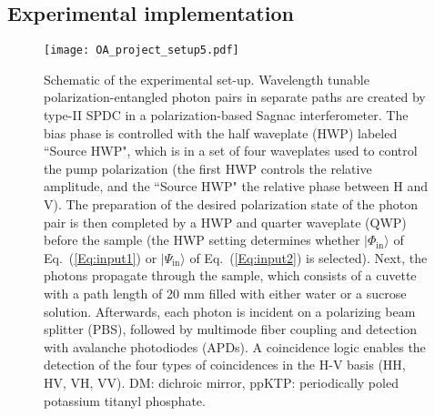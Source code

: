 \documentclass[12pt,preprint]{revtex4}
\begin{document}
\subsection*{Experimental implementation}
\begin{figure}[htb]
	\centering
		\texttt{[image: OA\_project\_setup5.pdf]}
	\caption{Schematic of the experimental set-up. Wavelength tunable polarization-entangled photon pairs in separate paths are created by type-II SPDC in a polarization-based Sagnac interferometer. The bias phase is controlled with the half waveplate (HWP) labeled ``Source HWP", which is in a set of four waveplates used to control the pump polarization (the first HWP controls the relative amplitude, and the ``Source HWP" the relative phase between H and V). The preparation of the desired polarization state of the photon pair is then completed by a HWP and quarter waveplate (QWP) before the sample (the HWP setting determines whether $|\Phi_{\mathrm{in}}\rangle$ of Eq.\ (\ref{Eq:input1}) or $|\Psi_{\mathrm{in}}\rangle$ of Eq.\ (\ref{Eq:input2}) is selected). Next, the photons propagate through the sample, which consists of a cuvette with a path length of 20 mm filled with either water or a sucrose solution. Afterwards, each photon is incident on a polarizing beam splitter (PBS), followed by multimode fiber coupling and detection with avalanche photodiodes (APDs). A coincidence logic enables the detection of the four types of coincidences in the H-V basis (HH, HV, VH, VV). DM: dichroic mirror, ppKTP: periodically poled potassium titanyl phosphate.}
	\label{fig:OA_project_setup}
\end{figure}
\end{document}
